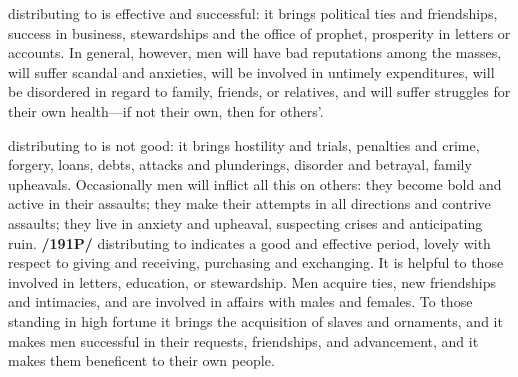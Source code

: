\Mercury\xspace distributing to \Jupiter\xspace is effective and successful: it brings political ties and friendships,
success in business, stewardships and the office of prophet, prosperity in letters or accounts. In general, however, men will have bad reputations among the masses, will suffer scandal and anxieties, will be involved in untimely expenditures, will be disordered in regard to family, friends, or relatives, and will suffer struggles for their own health—if not their own, then for others’.

\Mercury\xspace distributing to \Mars\xspace is not good: it brings hostility and trials, penalties and crime, forgery,
loans, debts, attacks and plunderings, disorder and betrayal, family upheavals. Occasionally men will inflict all this on others: they become bold and active in their assaults; they make their attempts in all directions and contrive assaults; they live in anxiety and upheaval, suspecting crises and anticipating ruin. \textbf{/191P/} \Mercury\xspace distributing to \Venus\xspace indicates a good and effective period, lovely with respect to giving and receiving, purchasing and exchanging. It is helpful to those involved in letters, education, or stewardship. Men acquire ties, new friendships and intimacies, and are involved in affairs with males and
females. To those standing in high fortune it brings the acquisition of slaves and ornaments, and it makes men successful in their requests, friendships, and advancement, and it makes them beneficent to their own people.

\newpage